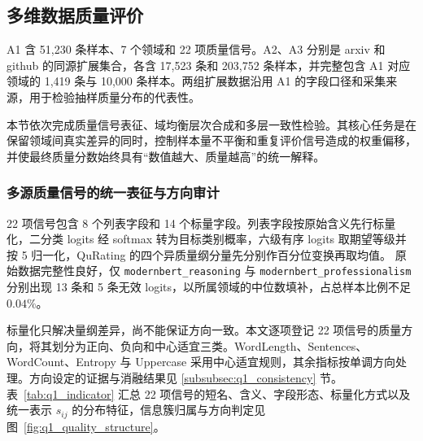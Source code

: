 \documentclass[bwprint]{gmcmthesis}
\begin{document}
\subsection{多维数据质量评价}
\label{subsec:q1_quality}

A1 含 51,230 条样本、7 个领域和 22 项质量信号。A2、A3 分别是 arxiv 和 github 的同源扩展集合，各含 17,523 条和 203,752 条样本，并完整包含 A1 对应领域的 1,419 条与 10,000 条样本。两组扩展数据沿用 A1 的字段口径和采集来源，用于检验抽样质量分布的代表性。

本节依次完成质量信号表征、域均衡层次合成和多层一致性检验。其核心任务是在保留领域间真实差异的同时，控制样本量不平衡和重复评价信号造成的权重偏移，并使最终质量分数始终具有“数值越大、质量越高”的统一解释。

\subsubsection{多源质量信号的统一表征与方向审计}

22 项信号包含 8 个列表字段和 14 个标量字段。列表字段按原始含义先行标量化，二分类 logits 经 softmax 转为目标类别概率，六级有序 logits 取期望等级并按 5 归一化，QuRating 的四个异质量纲分量先分别作百分位变换再取均值。
原始数据完整性良好，仅 \texttt{modernbert\_reasoning} 与 \texttt{modernbert\_professionalism} 分别出现 13 条和 5 条无效 logits，以所属领域的中位数填补，占总样本比例不足 $0.04\%$。

标量化只解决量纲差异，尚不能保证方向一致。本文逐项登记 22 项信号的质量方向，将其划分为正向、负向和中心适宜三类。WordLength、Sentences、WordCount、Entropy 与 Uppercase 采用中心适宜规则，其余指标按单调方向处理。方向设定的证据与消融结果见 \ref{subsubsec:q1_consistency} 节。
表~\ref{tab:q1_indicator} 汇总 22 项信号的短名、含义、字段形态、标量化方式以及统一表示 $s_{ij}$ 的分布特征，信息簇归属与方向判定见图~\ref{fig:q1_quality_structure}。
\end{document}
